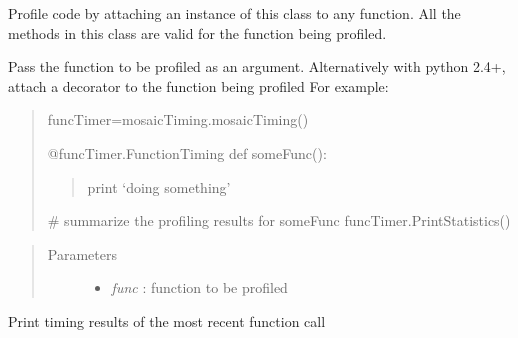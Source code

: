 \documentclass[letterpaper,10pt,english]{sphinxmanual}
\begin{document}
\begin{fulllineitems}
\label{api-doc/mosaic.misc:mosaic.utilities.mosaicTiming.mosaicTiming}
Profile code by attaching an instance of this class to any function. All the methods in this class are valid for the function being profiled.

\begin{fulllineitems}
\label{api-doc/mosaic.misc:mosaic.utilities.mosaicTiming.mosaicTiming.FunctionTiming}
Pass the function to be profiled as an argument. Alternatively with python 2.4+, attach a decorator to the function being profiled
For example:
\begin{quote}

funcTimer=mosaicTiming.mosaicTiming()

@funcTimer.FunctionTiming
def someFunc():
\begin{quote}

print `doing something'
\end{quote}

\# summarize the profiling results for someFunc
funcTimer.PrintStatistics()
\end{quote}
\begin{quote}\begin{description}
\item[{Parameters}] \leavevmode\begin{itemize}
\item {} 
\emph{func} :    function to be profiled

\end{itemize}

\end{description}\end{quote}

\end{fulllineitems}


\begin{fulllineitems}
\label{api-doc/mosaic.misc:mosaic.utilities.mosaicTiming.mosaicTiming.PrintCurrentTime}
Print timing results of the most recent function call


\end{fulllineitems}
\end{fulllineitems}
\end{document}
